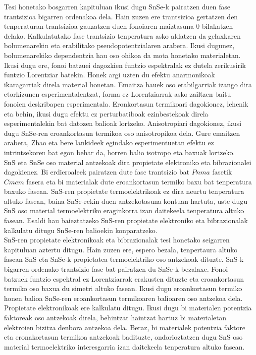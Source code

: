 Tesi honetako bosgarren kapituluan ikusi dugu SnSe-k pairatzen duen fase trantsizioa bigarren ordenakoa dela. Hain 
zuzen ere trantsizioa gertatzen den tenperaturan trantsizioa gauzatzen duen fonoiaren maiztasuna 0 bilakatzen delako. 
Kalkulatutako fase trantsizio tenperatura asko aldatzen da gelaxkaren bolumenarekin eta erabilitako 
pseudopotentzialaren arabera. Ikusi dugunez, bolumenarekiko dependentzia hau oso ohikoa da mota honetako 
materialetan. Ikusi dugu ere, fonoi batzuei dagozkien funtzio espektralak ez dutela zerikusirik funtzio Lorentziar 
batekin. Honek argi uzten du efektu anarmonikoak ikaragarriak direla material honetan. Emaitza hauek oso 
erabilgarriak izango dira etorkizunen esperimentalentzat, forma ez Lorentziarrak asko zailtzen baitu fonoien 
deskribapen esperimentala. Eronkortasun termikoari dagokionez, lehenik eta behin, ikusi dugu efektu ez 
perturbatiboak ezinbestekoak direla esperimentalekin bat datozen balioak lortzeko. Anisotropiari dagokionez, ikusi 
dugu SnSe-ren eroankortasun termikoa oso anisotropikoa dela. Gure emaitzen arabera, Zhao eta bere lankideek egindako 
esperimentuetan efektu ez intrintsekoren bat egon behar da, horren balio isotropo eta baxuak lortzeko. \\

SnS eta SnSe oso material antzekoak dira propietate elektroniko eta bibrazionalei dagokienez. Bi erdieroaleek 
pairatzen dute fase trantsizio bat $Pnma$ fasetik $Cmcm$ fasera eta bi materialak dute eroankortasun termiko baxu 
bat tenperatura baxuko fasean. SnS-ren propietate termoelektrikoak ez dira neurtu tenperatura altuko fasean, baina 
SnSe-rekin duen antzekotasuna kontuan hartuta, uste dugu SnS oso material termoelektriko eraginkorra izan daitekeela 
tenperatura altuko fasean. Esaldi hau baieztatzeko SnS-ren propietate elektroniko eta bibrazionalak kalkulatu ditugu 
SnSe-ren balioekin konparatzeko. \\

SnS-ren propietate elektronikoak eta bibrazionalak tesi honetako seigarren kapituluan aztertu ditugu.
Hain zuzen ere, espero bezala, tenpertaura altuko fasean SnS eta SnSe-k propietatea termoelektriko oso antzekoak 
dituzte. SnS-k bigarren ordenako trantsizio fase bat pairatzen du SnSe-k bezalaxe. Fonoi batzuek funtzio espektral 
ez Lorentziarrak erakusten dituzte eta eroankortasun termiko oso baxua du simetri altuko fasean. Ikusi dugu 
eroankortasun termiko honen balioa SnSe-ren eroankortasun termikoaren balioaren oso antzekoa dela. Propietate 
elektronikoak ere kalkulatu ditugu. Ikusi dugu bi materialen potentzia faktoreak oso antzekoak direla, behintzat
haintzat hartuz bi materialetan elektroien bizitza denbora antzekoa dela. Beraz, bi materialek potentzia faktore 
eta eronakortasun termikoa antzekoak badituzte, ondorioztatzen dugu SnS oso material termoelektriko interesgarria 
izan daitekeela tenperatura altuko fasean. \\
